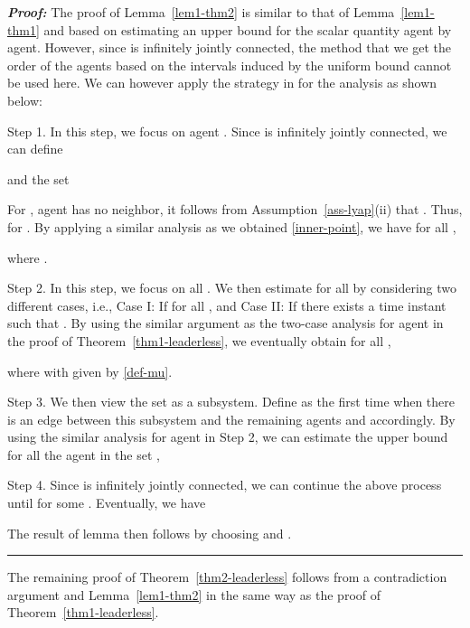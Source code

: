 \documentclass[a4paper, 11pt]{article}
\newenvironment{IEEEproof}[1][\bf Proof]{\smallskip\par\noindent\textit{#1: }}{\hspace*{\fill} \rule{6pt}{6pt}\smallskip}
\begin{document}
\begin{IEEEproof}
The proof of Lemma~\ref{lem1-thm2} is similar to that of Lemma~\ref{lem1-thm1} and based on estimating
an upper bound for the scalar quantity  agent by agent.
However, since  is infinitely jointly connected,
the method that we get the order of the agents based on the intervals induced by the uniform bound  cannot be used here.
We can however apply the strategy in \cite{shi-johansson-hong} for the analysis as shown below: 

\noindent Step 1. In this step, we focus on agent . Since  is infinitely jointly connected,
we can define

and the set

For , agent  has no neighbor, it follows from Assumption~\ref{ass-lyap}(ii) that
.
Thus,  for .
By applying a similar analysis as we obtained \eqref{inner-point}, we have for all ,

where .

\vspace{2mm}

\noindent Step 2. In this step, we focus on all .
We then estimate  for all  by considering two different cases, i.e.,
Case I: If  for all , and
Case II: If there exists a time instant  such that
.
By using the similar argument as the two-case analysis for agent  in the proof of Theorem~\ref{thm1-leaderless},
we eventually obtain for all ,

where  with  given by \eqref{def-mu}.

\vspace{2mm}

\noindent Step 3. We then view the set  as a subsystem. Define 
as the first time when there is an edge between this subsystem and the remaining agents and  accordingly.
By using the similar analysis for agent  in Step 2, we can estimate the upper bound for all the agent in the set
,

\vspace{2mm}

\noindent Step 4. Since  is infinitely jointly connected, we can continue the above process until
 for some .
Eventually, we have

The result of lemma then follows by choosing  and .
\end{IEEEproof}

The remaining proof of Theorem~\ref{thm2-leaderless} follows from a contradiction argument
and Lemma~\ref{lem1-thm2} in the same way as the proof of Theorem~\ref{thm1-leaderless}.
\end{document}
